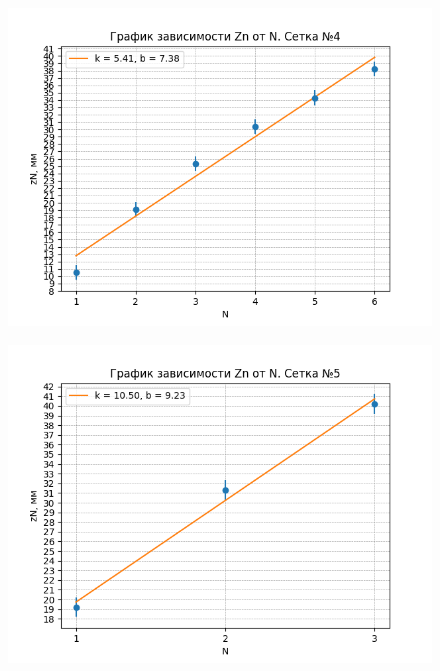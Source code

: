 \documentclass[a4paper,12pt]{article}
\begin{document}
\begin{figure}[H]
\centering
\includegraphics[scale=0.65]{4.png}
\end{figure}


\begin{figure}[H]
\centering
\includegraphics[scale=0.65]{5.png}
\end{figure}
\end{document}
